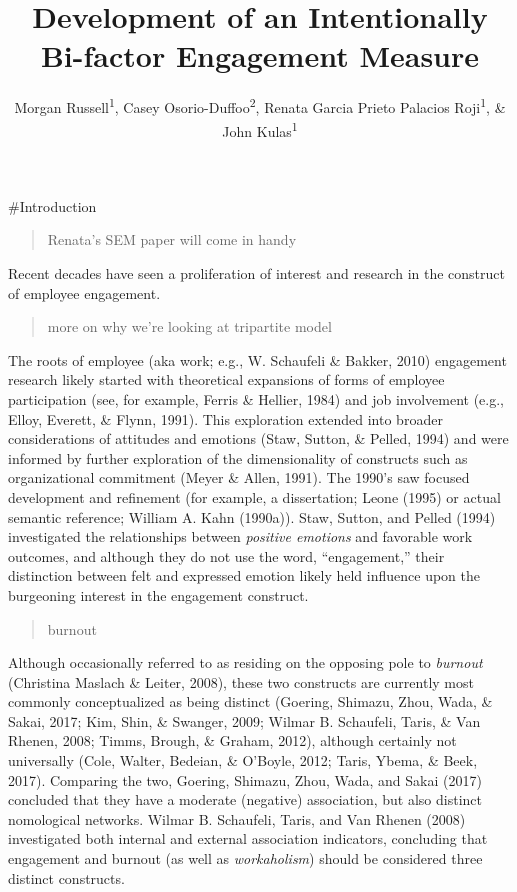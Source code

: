 \documentclass[
  english,
  man]{apa6}
\title{Development of an Intentionally Bi-factor Engagement Measure}
\author{Morgan Russell\textsuperscript{1}, Casey Osorio-Duffoo\textsuperscript{2}, Renata Garcia Prieto Palacios Roji\textsuperscript{1}, \& John Kulas\textsuperscript{1}}
\date{}
\affiliation{\vspace{0.5cm}\textsuperscript{1} Montclair State University\\\textsuperscript{2} Harver}
\begin{document}
\maketitle

\#Introduction

\begin{quote}
Renata's SEM paper will come in handy
\end{quote}

Recent decades have seen a proliferation of interest and research in the construct of employee engagement.

\begin{quote}
more on why we're looking at tripartite model
\end{quote}

The roots of employee (aka work; e.g., W. Schaufeli \& Bakker, 2010) engagement research likely started with theoretical expansions of forms of employee participation (see, for example, Ferris \& Hellier, 1984) and job involvement (e.g., Elloy, Everett, \& Flynn, 1991). This exploration extended into broader considerations of attitudes and emotions (Staw, Sutton, \& Pelled, 1994) and were informed by further exploration of the dimensionality of constructs such as organizational commitment (Meyer \& Allen, 1991). The 1990's saw focused development and refinement (for example, a dissertation; Leone (1995) or actual semantic reference; William A. Kahn (1990a)). Staw, Sutton, and Pelled (1994) investigated the relationships between \emph{positive emotions} and favorable work outcomes, and although they do not use the word, ``engagement,'' their distinction between felt and expressed emotion likely held influence upon the burgeoning interest in the engagement construct.

\begin{quote}
burnout
\end{quote}

Although occasionally referred to as residing on the opposing pole to \emph{burnout} (Christina Maslach \& Leiter, 2008), these two constructs are currently most commonly conceptualized as being distinct (Goering, Shimazu, Zhou, Wada, \& Sakai, 2017; Kim, Shin, \& Swanger, 2009; Wilmar B. Schaufeli, Taris, \& Van Rhenen, 2008; Timms, Brough, \& Graham, 2012), although certainly not universally (Cole, Walter, Bedeian, \& O'Boyle, 2012; Taris, Ybema, \& Beek, 2017). Comparing the two, Goering, Shimazu, Zhou, Wada, and Sakai (2017) concluded that they have a moderate (negative) association, but also distinct nomological networks. Wilmar B. Schaufeli, Taris, and Van Rhenen (2008) investigated both internal and external association indicators, concluding that engagement and burnout (as well as \emph{workaholism}) should be considered three distinct constructs.
\end{document}
